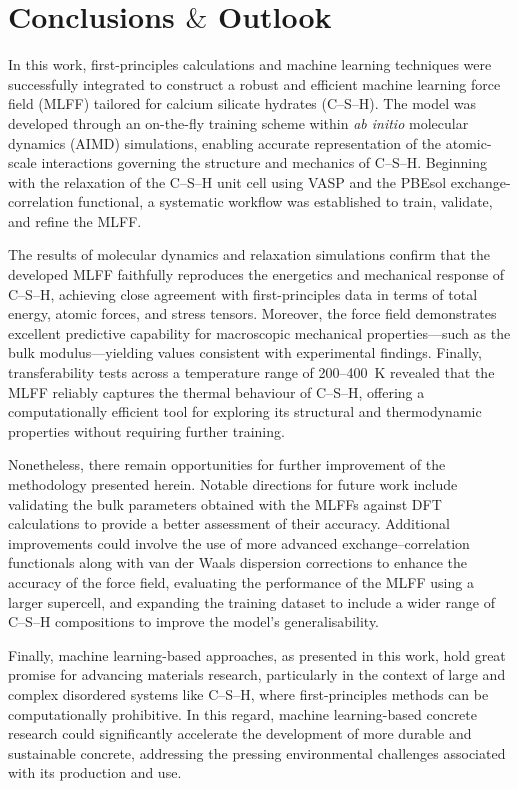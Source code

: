 \chapter{\texorpdfstring{Conclusions $\&$ Outlook}{Conclusions \& Outlook}} %

\label{Chapter5} %

In this work, first-principles calculations and machine learning techniques were successfully integrated to construct a robust and efficient machine learning force field (MLFF) tailored for calcium silicate hydrates (C--S--H). The model was developed through an on-the-fly training scheme within \emph{ab initio} molecular dynamics (AIMD) simulations, enabling accurate representation of the atomic-scale interactions governing the structure and mechanics of C--S--H. Beginning with the relaxation of the C--S--H unit cell using VASP and the PBEsol exchange-correlation functional, a systematic workflow was established to train, validate, and refine the MLFF.

The results of molecular dynamics and relaxation simulations confirm that the developed MLFF faithfully reproduces the energetics and mechanical response of C--S--H, achieving close agreement with first-principles data in terms of total energy, atomic forces, and stress tensors. Moreover, the force field demonstrates excellent predictive capability for macroscopic mechanical properties—such as the bulk modulus---yielding values consistent with experimental findings. Finally, transferability tests across a temperature range of 200--400~K revealed that the MLFF reliably captures the thermal behaviour of C--S--H, offering a computationally efficient tool for exploring its structural and thermodynamic properties without requiring further training.


Nonetheless, there remain opportunities for further improvement of the methodology presented herein. Notable directions for future work include validating the bulk parameters obtained with the MLFFs against DFT calculations to provide a better assessment of their accuracy. Additional improvements could involve the use of more advanced exchange–correlation functionals along with van der Waals dispersion corrections to enhance the accuracy of the force field, evaluating the performance of the MLFF using a larger supercell, and expanding the training dataset to include a wider range of C--S--H compositions to improve the model's generalisability.

Finally, machine learning-based approaches, as presented in this work, hold great promise for advancing materials research, particularly in the context of large and complex disordered systems like C--S--H, where first-principles methods can be computationally prohibitive. In this regard, machine learning-based concrete research could significantly accelerate the development of more durable and sustainable concrete, addressing the pressing environmental challenges associated with its production and use.



